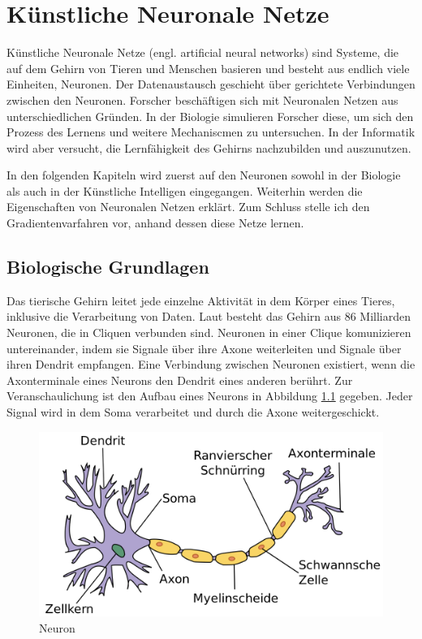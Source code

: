 \chapter{Künstliche Neuronale Netze} \label{ANN}

Künstliche Neuronale Netze (engl. artificial neural networks) sind Systeme, die auf dem Gehirn von Tieren und Menschen basieren und besteht aus endlich viele Einheiten, Neuronen. Der Datenaustausch geschieht über gerichtete Verbindungen zwischen den Neuronen. Forscher beschäftigen sich mit Neuronalen Netzen aus unterschiedlichen Gründen. In der Biologie simulieren Forscher diese, um sich den Prozess des Lernens und weitere Mechaniscmen zu untersuchen. In der Informatik wird aber versucht, die Lernfähigkeit des Gehirns nachzubilden und auszunutzen.

In den folgenden Kapiteln wird zuerst auf den Neuronen sowohl in der Biologie als auch in der Künstliche Intelligen eingegangen. Weiterhin werden die Eigenschaften von Neuronalen Netzen erklärt. Zum Schluss stelle ich den Gradientenvarfahren vor, anhand dessen diese Netze lernen.

\section{Biologische Grundlagen}

Das tierische Gehirn leitet jede einzelne Aktivität in dem Körper eines Tieres, inklusive die Verarbeitung von Daten. Laut \cite{GEHIRN:12} besteht das Gehirn aus 86 Milliarden Neuronen, die in Cliquen verbunden sind. Neuronen in einer Clique komunizieren untereinander, indem sie Signale über ihre Axone weiterleiten und Signale über ihren Dendrit empfangen. Eine Verbindung zwischen Neuronen existiert, wenn die Axonterminale eines Neurons den Dendrit eines anderen berührt. Zur Veranschaulichung ist den Aufbau eines Neurons in Abbildung \ref{neuron} gegeben. Jeder Signal wird in dem Soma verarbeitet und durch die Axone weitergeschickt.

\begin{figure}[!htbp]
	\centering
	\includegraphics[scale=0.2]{images/Neuron_(deutsch)-1.png}
	\caption{Neuron \cite{NWIKI:19}}\label{neuron}
\end{figure}

